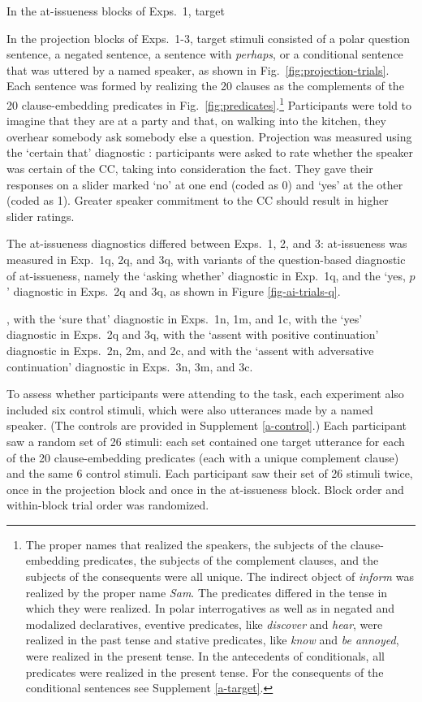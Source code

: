 \documentclass[11pt,fleqn]{article}
\newcommand{\6}{\mbox{$[\hspace*{-.6mm}[$}}
\newcommand{\9}{\mbox{$]\hspace*{-.6mm}]$}}
\begin{document}
In the at-issueness blocks of Exps.~1, target 

In the projection blocks of Exps.~1-3, target stimuli consisted of a polar question sentence, a negated sentence, a sentence with {\em perhaps}, or a conditional sentence that was uttered by a named speaker, as shown in Fig.~\ref{fig:projection-trials}. Each sentence was formed by realizing the 20 clauses as the complements of the 20 clause-embedding predicates in Fig.~\ref{fig:predicates}.\footnote{The proper names that realized the speakers, the subjects of the clause-embedding predicates, the subjects of the complement clauses, and the subjects of the consequents  were all unique. The indirect object of {\em inform} was realized by the proper name {\em Sam}. The predicates differed in the tense in which they were realized. In polar interrogatives as well as in negated and modalized declaratives, eventive predicates, like {\em discover} and {\em hear}, were realized in the past tense and stative predicates, like {\em know} and {\em be annoyed}, were realized in the present tense.  In the antecedents of conditionals, all predicates were realized in the present tense. For the consequents of the conditional sentences see Supplement \ref{a-target}.} Participants were told to imagine that they are at a party and that, on walking into the kitchen, they overhear somebody ask somebody else a question. Projection was measured using the `certain that' diagnostic \cite{djaerv-bacovcin-salt27,tbd-variability, lorson2018, mahler2020}: participants were asked to rate whether the speaker was certain of the CC, taking into consideration the fact. They gave their responses on a slider marked `no' at one end (coded as 0) and `yes' at the other (coded as 1). Greater speaker commitment to the CC should result in higher slider ratings.

The at-issueness diagnostics differed between Exps.~1, 2, and 3: at-issueness was measured in Exp.~1q, 2q, and 3q, with variants of the question-based diagnostic of at-issueness, namely the `asking whether' diagnostic in Exp.~1q, and the `yes, $p$' diagnostic in Exps.~2q and 3q, as shown in Figure \ref{fig-ai-trials-q}.


, with the `sure that' diagnostic in Exps.~1n, 1m, and 1c, with the `yes' diagnostic in Exps.~2q and 3q, with the `assent with positive continuation' diagnostic in Exps.~2n, 2m, and 2c,  and with the `assent with adversative continuation' diagnostic in Exps.~3n, 3m, and 3c.  


To assess whether participants were attending to the task, each experiment also included six control stimuli, which were also utterances made by a named speaker. (The controls are provided in Supplement \ref{a-control}.) Each participant saw a random set of 26 stimuli: each set contained one target utterance for each of the 20 clause-embedding predicates (each with a unique complement clause) and the same 6 control stimuli. Each participant saw their set of 26 stimuli twice, once in the projection block and once in the at-issueness block. Block order and within-block trial order was randomized. 
\end{document}
